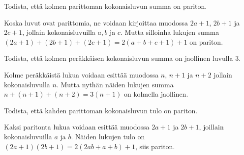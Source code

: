 

\begin{kotitehtavasivu}

	\begin{tehtava}
		\begin{vastaus}
		\end{vastaus}
	\end{tehtava}

	\begin{tehtava}
		Todista, että kolmen parittoman kokonaisluvun summa on pariton.
		\begin{vastaus}
			Koska luvut ovat parittomia, ne voidaan kirjoittaa muodossa $2a + 1$, $2b + 1$ ja $2c + 1$, jollain kokonaisluvuilla $a, b$ ja $c$. Mutta silloinha lukujen summa $(2a+1) + (2b+ 1) + (2c + 1) = 2(a+b+c+1) + 1$ on pariton.
		\end{vastaus}
	\end{tehtava}

	\begin{tehtava}
		Todista, että kolmen peräkkäisen kokonaisluvun summa on jaollinen luvulla 3.
		\begin{vastaus}
			Kolme peräkkäistä lukua voidaan esittää muodossa $n$, $n + 1$ ja $n + 2$ jollain kokonaisluvulla $n$. Mutta nythän näiden lukujen summa $n + (n + 1) + (n + 2) = 3(n +1)$ on kolmella jaollinen.
		\end{vastaus}
	\end{tehtava}

	\begin{tehtava}
		Todista, että kahden parittoman kokonaisluvun tulo on pariton.
		\begin{vastaus}
			Kaksi paritonta lukua voidaan esittää muodossa $2a+1$ ja $2b + 1$, joillain kokonaisluvuilla $a$ ja $b$. Näiden lukujen tulo on $(2a+1)(2b+1) = 2(2ab+a +b) + 1$, siis pariton.
		\end{vastaus}
	\end{tehtava}


\end{kotitehtavasivu}
